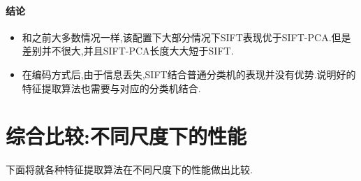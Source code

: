 \paragraph{结论}
\begin{itemize}
	\item 和之前大多数情况一样,该配置下大部分情况下SIFT表现优于SIFT-PCA.但是差别并不很大,并且SIFT-PCA长度大大短于SIFT.
	\item 在编码方式后,由于信息丢失,SIFT结合普通分类机的表现并没有优势.说明好的特征提取算法也需要与对应的分类机结合.
\end{itemize}

\section{综合比较:不同尺度下的性能}

下面将就各种特征提取算法在不同尺度下的性能做出比较. \newline

